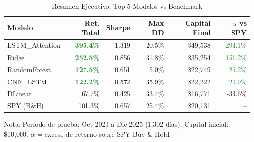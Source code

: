 \begin{table}[htbp]
\centering
\caption{Resumen Ejecutivo: Top 5 Modelos vs Benchmark}
\label{tab:executive_summary}
\begin{tabular}{@{}lrrrrr@{}}
\toprule
\textbf{Modelo} & \textbf{Ret. Total} & \textbf{Sharpe} & \textbf{Max DD} & \textbf{Capital Final} & \textbf{$\alpha$ vs SPY} \\
\midrule
LSTM\_Attention & \textbf{\textcolor{ForestGreen}{395.4\%}} & 1.319 & 20.5\% & \$49,538 & \textcolor{ForestGreen}{294.1\%} \\
Ridge & \textbf{\textcolor{ForestGreen}{252.5\%}} & 0.856 & 31.8\% & \$35,254 & \textcolor{ForestGreen}{151.2\%} \\
RandomForest & \textbf{\textcolor{ForestGreen}{127.5\%}} & 0.651 & 15.0\% & \$22,749 & \textcolor{ForestGreen}{26.2\%} \\
CNN\_LSTM & \textbf{\textcolor{ForestGreen}{122.2\%}} & 0.572 & 35.9\% & \$22,222 & \textcolor{ForestGreen}{20.9\%} \\
DLinear & 67.7\% & 0.425 & 33.4\% & \$16,771 & -33.6\% \\
\midrule
SPY (B\&H) & 101.3\% & 0.657 & 25.4\% & \$20,131 & -- \\
\bottomrule
\end{tabular}
\begin{tablenotes}
\small
\item Nota: Per\'iodo de prueba: Oct 2020 a Dic 2025 (1,302 d\'ias). Capital inicial: \$10,000. $\alpha$ = exceso de retorno sobre SPY Buy \& Hold.
\end{tablenotes}
\end{table}
